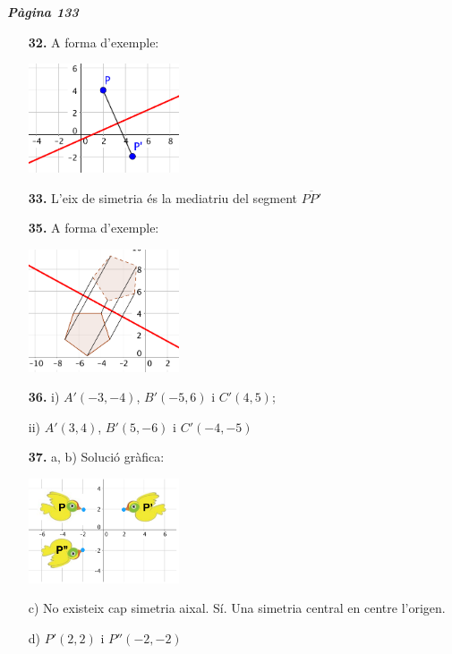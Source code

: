 \documentclass[a4paper, pdf, twoside]{book}
\begin{document}
\begin{multicols}{2}
{\textbf{\em Pàgina 133}} \hrulefill
\begin{enumerate}
\vspace{0.25cm}
\item[\fontfamily{phv}\selectfont\color{blue}\textbf{32. }] 
A forma d'exemple:\par \includegraphics [width=0.35\textwidth ]{img-sol/t10-33}
 \end{enumerate}
\begin{enumerate}
\vspace{0.25cm}
\item[\fontfamily{phv}\selectfont\color{blue}\textbf{33. }] 
L'eix de simetria és la mediatriu del segment $\overline {PP'}$
\vspace{0.25cm}
\item[\fontfamily{phv}\selectfont\color{blue}\textbf{35. }] 
A forma d'exemple:\par \includegraphics [width=0.35\textwidth ]{img-sol/t10-36}
\vspace{0.25cm}
\item[\fontfamily{phv}\selectfont\color{blue}\textbf{36. }]  \scalebox{0.6}{\simbolclau } 
i) $A'(-3,-4)$, $B'(-5,6)$ i $C'(4,5)$;\par ii) $A'(3,4)$, $B'(5,-6)$ i $C'(-4,-5)$
\vspace{0.25cm}
\item[\fontfamily{phv}\selectfont\color{blue}\textbf{37. }] 
a, b) Solució gràfica:\par \includegraphics [width=0.35\textwidth ]{img-sol/t10-38}\par c) No existeix cap simetria aixal. Sí. Una simetria central en centre l'origen. \par d) $P'(2,2)$ i $P''(-2,-2)$
 \end{enumerate}
\vspace{0.3cm}


\end{multicols}
\end{document}

